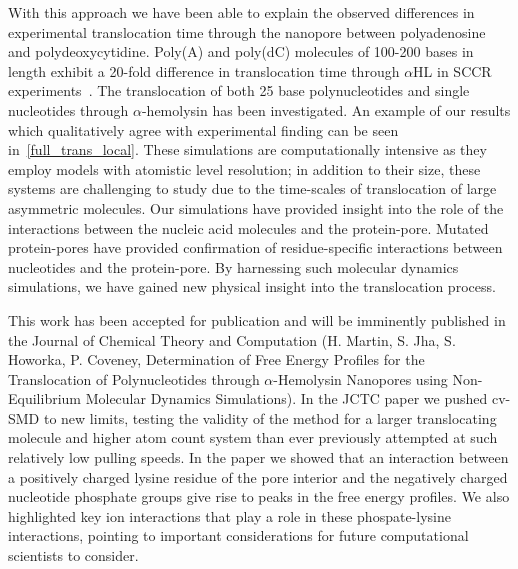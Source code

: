 \documentclass[a4paper,10pt]{article}
\newcommand{\ahl}{$\alpha$HL }
\begin{document}
With this approach we have been able to explain the observed
differences in experimental translocation time through the nanopore
between polyadenosine and polydeoxycytidine. Poly(A) and poly(dC)
molecules of 100-200 bases in length exhibit a 20-fold difference in
translocation time through \ahl in SCCR
experiments~\cite{akeson}. The translocation of both 25 base
polynucleotides and single nucleotides through $\alpha$-hemolysin has
been investigated. An example of our results which qualitatively agree
with experimental finding can be seen in~\ref{full_trans_local}. These
simulations are computationally intensive as they employ models with
atomistic level resolution; in addition to their size, these systems
are challenging to study due to the time-scales of translocation of
large asymmetric molecules. Our simulations have provided insight into
the role of the interactions between the nucleic acid molecules and
the protein-pore. Mutated protein-pores have provided confirmation of
residue-specific interactions between nucleotides and the
protein-pore. By harnessing such molecular dynamics simulations, we
have gained new physical insight into the translocation process. 

This work has been accepted for publication and will be imminently published in the Journal of Chemical Theory and Computation (H. Martin, S. Jha, S. Howorka, P. Coveney, Determination of Free Energy Profiles for the Translocation of Polynucleotides through $\alpha$-Hemolysin Nanopores using Non-Equilibrium Molecular Dynamics Simulations). In the JCTC paper we pushed cv-SMD to new limits, testing the validity of the method for a larger translocating molecule and higher atom count system than ever previously attempted at such relatively low pulling speeds. In the paper we showed that an interaction between a positively charged lysine residue of the pore interior and the negatively charged nucleotide phosphate groups give rise to peaks in the free energy profiles. We also highlighted key ion interactions that play a role in these phospate-lysine interactions, pointing to important considerations for future computational scientists to consider.
\end{document}
